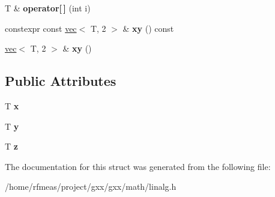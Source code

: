 \begin{DoxyCompactItemize}
\item 
T \& {\bfseries operator\mbox{[}$\,$\mbox{]}} (int i)\hypertarget{structlinalg_1_1vec_3_01T_00_013_01_4_aa401b8175a924274284aced25e989d1b}{}\label{structlinalg_1_1vec_3_01T_00_013_01_4_aa401b8175a924274284aced25e989d1b}

\item 
constexpr const \hyperlink{structlinalg_1_1vec}{vec}$<$ T, 2 $>$ \& {\bfseries xy} () const \hypertarget{structlinalg_1_1vec_3_01T_00_013_01_4_a967d5621b588383a7cf1bdc02d259153}{}\label{structlinalg_1_1vec_3_01T_00_013_01_4_a967d5621b588383a7cf1bdc02d259153}

\item 
\hyperlink{structlinalg_1_1vec}{vec}$<$ T, 2 $>$ \& {\bfseries xy} ()\hypertarget{structlinalg_1_1vec_3_01T_00_013_01_4_a75e8b03c388f9866cd1f517c3c7ef8ca}{}\label{structlinalg_1_1vec_3_01T_00_013_01_4_a75e8b03c388f9866cd1f517c3c7ef8ca}

\end{DoxyCompactItemize}
\subsection*{Public Attributes}
\begin{DoxyCompactItemize}
\item 
T {\bfseries x}\hypertarget{structlinalg_1_1vec_3_01T_00_013_01_4_a947bef3102e621975b38f846e59dc417}{}\label{structlinalg_1_1vec_3_01T_00_013_01_4_a947bef3102e621975b38f846e59dc417}

\item 
T {\bfseries y}\hypertarget{structlinalg_1_1vec_3_01T_00_013_01_4_a45058cb6a19ac24f3ececac94d088c7d}{}\label{structlinalg_1_1vec_3_01T_00_013_01_4_a45058cb6a19ac24f3ececac94d088c7d}

\item 
T {\bfseries z}\hypertarget{structlinalg_1_1vec_3_01T_00_013_01_4_a4b3ef36f8847a81304e991e650218f5d}{}\label{structlinalg_1_1vec_3_01T_00_013_01_4_a4b3ef36f8847a81304e991e650218f5d}

\end{DoxyCompactItemize}


The documentation for this struct was generated from the following file\+:\begin{DoxyCompactItemize}
\item 
/home/rfmeas/project/gxx/gxx/math/linalg.\+h\end{DoxyCompactItemize}
